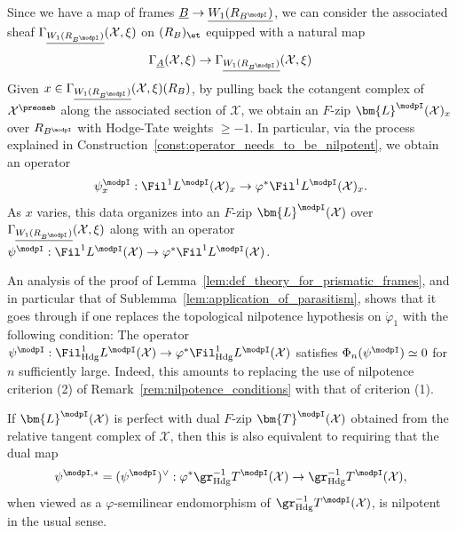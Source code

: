 \documentclass[10pt]{amsart}
\begin{document}
\begin{construction}
 \label{const:f_zip_sections_psi_x}
Since we have a map of frames $\underline{B}\to \underline{W_1(R_{B^\modpI})}$, we can consider the associated sheaf $\Gamma_{\underline{W_1(R_{B^\modpI})}}(\mathcal{X},\xi)$ on $(R_B)_{\et}$ equipped with a natural map  
\[
\Gamma_{\underline{A}}(\mathcal{X},\xi)\to \Gamma_{\underline{W_1(R_{B^\modpI})}}(\mathcal{X},\xi)
\]
Given $x\in \Gamma_{\underline{W_1(R_{B^\modpI})}}(\mathcal{X},\xi)(R_B)$, by pulling back the cotangent complex of $\mathcal{X}^\preoneb$ along the associated section of $\mathcal{X}$, we obtain an $F$-zip $\bm{L}^\modpI(\mathcal{X})_x$ over $R_{B^\modpI}$ with Hodge-Tate weights $\ge -1$. In particular, via the process explained in Construction~\ref{const:operator_needs_to_be_nilpotent}, we obtain an operator
\[
\psi^\modpI_x:\Fil^1L^\modpI(\mathcal{X})_x \to \varphi^*\Fil^1L^\modpI(\mathcal{X})_x.
\]
As $x$ varies, this data organizes into an $F$-zip $\bm{L}^\modpI(\mathcal{X})$ over $\Gamma_{\underline{W_1(R_{B^\modpI})}}(\mathcal{X},\xi)$ along with an operator $\psi^\modpI:\Fil^1L^\modpI(\mathcal{X}) \to \varphi^*\Fil^1L^\modpI(\mathcal{X})$.
\end{construction} 


\begin{remark}
\label{rem:nilpotent_locus}
An analysis of the proof of Lemma~\ref{lem:def_theory_for_prismatic_frames}, and in particular that of Sublemma~\ref{lem:application_of_parasitism}, shows that it goes through if one replaces the topological nilpotence hypothesis on $\dot\varphi_1$ with the following condition: The operator $\psi^\modpI:\Fil^1_{\mathrm{Hdg}}L^\modpI(\mathcal{X})\to \varphi^*\Fil^1_{\mathrm{Hdg}}L^\modpI(\mathcal{X})$ satisfies $\Phi_n(\psi^\modpI)\simeq 0$ for $n$ sufficiently large. Indeed, this amounts to replacing the use of nilpotence criterion (2) of Remark~\ref{rem:nilpotence_conditions} with that of criterion (1). 

If $\bm{L}^\modpI(\mathcal{X})$ is perfect with dual $F$-zip $\bm{T}^\modpI(\mathcal{X})$ obtained from the relative tangent complex of $\mathcal{X}$, then this is also equivalent to requiring that the dual map 
\[
\psi^{\modpI,*} = (\psi^\modpI)^\vee:\varphi^*\gr^{-1}_{\mathrm{Hdg}}T^\modpI(\mathcal{X})\to \gr^{-1}_{\mathrm{Hdg}}T^\modpI(\mathcal{X}),
\]
when viewed as a $\varphi$-semilinear endomorphism of $\gr^{-1}_{\mathrm{Hdg}}T^\modpI(\mathcal{X})$, is nilpotent in the usual sense. 
\end{remark}
\end{document}
